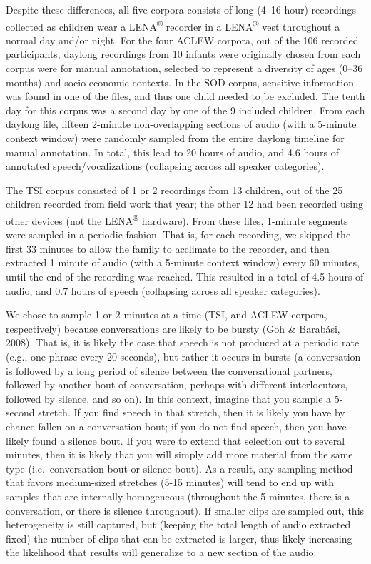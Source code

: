 \documentclass[english,table,man,floatsintext]{apa6}
\begin{document}
Despite these differences, all five corpora consists of long (4--16 hour) recordings collected as children wear a LENA\textsuperscript{®} recorder in a LENA\textsuperscript{®} vest throughout a normal day and/or night. For the four ACLEW corpora, out of the 106 recorded participants, daylong recordings from 10 infants were originally chosen from each corpus were for manual annotation, selected to represent a diversity of ages (0--36 months) and socio-economic contexts. In the SOD corpus, sensitive information was found in one of the files, and thus one child needed to be excluded. The tenth day for this corpus was a second day by one of the 9 included children. From each daylong file, fifteen 2-minute non-overlapping sections of audio (with a 5-minute context window) were randomly sampled from the entire daylong timeline for manual annotation. In total, this lead to 20 hours of audio, and 4.6 hours of annotated speech/vocalizations (collapsing across all speaker categories).

The TSI corpus consisted of 1 or 2 recordings from 13 children, out of the 25 children recorded from field work that year; the other 12 had been recorded using other devices (not the LENA\textsuperscript{®} hardware). From these files, 1-minute segments were sampled in a periodic fashion. That is, for each recording, we skipped the first 33 minutes to allow the family to acclimate to the recorder, and then extracted 1 minute of audio (with a 5-minute context window) every 60 minutes, until the end of the recording was reached. This resulted in a total of 4.5 hours of audio, and 0.7 hours of speech (collapsing across all speaker categories).

We chose to sample 1 or 2 minutes at a time (TSI, and ACLEW corpora, respectively) because conversations are likely to be bursty (Goh \& Barabási, 2008). That is, it is likely the case that speech is not produced at a periodic rate (e.g., one phrase every 20 seconds), but rather it occurs in bursts (a conversation is followed by a long period of silence between the conversational partners, followed by another bout of conversation, perhaps with different interlocutors, followed by silence, and so on). In this context, imagine that you sample a 5-second stretch. If you find speech in that stretch, then it is likely you have by chance fallen on a conversation bout; if you do not find speech, then you have likely found a silence bout. If you were to extend that selection out to several minutes, then it is likely that you will simply add more material from the same type (i.e.~conversation bout or silence bout). As a result, any sampling method that favors medium-sized stretches (5-15 minutes) will tend to end up with samples that are internally homogeneous (throughout the 5 minutes, there is a conversation, or there is silence throughout). If smaller clips are sampled out, this heterogeneity is still captured, but (keeping the total length of audio extracted fixed) the number of clips that can be extracted is larger, thus likely increasing the likelihood that results will generalize to a new section of the audio.
\end{document}
